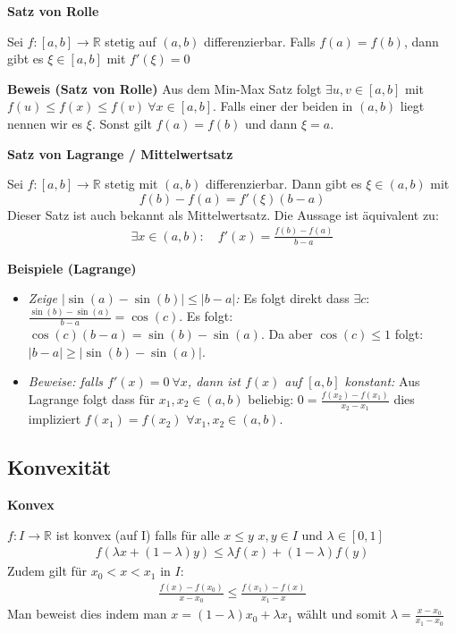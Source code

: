 \documentclass[25pt]{sciposter}
\newcommand{\R}{\mathbb{R}}
\newenvironment{method}[1]{\begin{mdframed}[backgroundcolor=blue!10,innertopmargin=15pt, innerbottommargin=15pt,nobreak=true]
		\textbf{#1 }
	}
	{ 
	\end{mdframed}
}
\begin{document}
\begin{multicols}{3}
\begin{method}{Satz von Rolle}
	Sei $f: [a,b] \to \R$ stetig auf $(a,b)$ differenzierbar. Falls $f(a) = f(b)$, dann gibt es $\xi \in [a,b]$ mit $f'(\xi) = 0$
\end{method}
\textbf{Beweis (Satz von Rolle)} Aus dem Min-Max Satz folgt $\exists u,v \in [a,b]$ mit $f(u) \leq f(x) \leq f(v) \ \forall x \in [a,b]$. Falls einer der beiden in $(a,b)$ liegt nennen wir es $\xi$. Sonst gilt $f(a) = f(b)$ und dann $\xi = a$.


\begin{method}{Satz von Lagrange / Mittelwertsatz}
	Sei $f:[a,b] \to \R$ stetig mit $(a,b)$ differenzierbar. Dann gibt es $\xi \in (a,b)$ mit $$f(b) - f(a) = f'(\xi) (b-a)$$
	Dieser Satz ist auch bekannt als Mittelwertsatz. Die Aussage ist äquivalent zu: 
	\begin{align*}
		\exists x \in (a,b) : \quad f'(x) = \frac{f(b) -f(a) }{b-a}
	\end{align*}
\end{method}
\textbf{Beispiele (Lagrange)}
\begin{itemize}
	\item \textit{Zeige $|\sin(a) - \sin(b)| \leq |b-a|$:} Es folgt direkt dass $\exists c$: $\frac{\sin(b)- \sin(a)}{b-a} = \cos(c)$. Es folgt: $\cos(c) (b-a) = \sin(b) - \sin(a)$. Da aber $\cos(c) \leq 1$ folgt:
	$|b-a| \geq |\sin(b) - \sin(a)|$.
	\item \textit{Beweise: falls $f'(x) = 0 \ \forall x$, dann ist $f(x)$ auf $[a,b]$ konstant:} Aus Lagrange folgt dass für $x_1,x_2\in (a,b)$ beliebig: $0 = \frac{f(x_2)-f(x_1)}{x_2-x_1}$ dies impliziert $f(x_1) = f(x_2)$ $\forall x_1,x_2 \in (a,b)$.
\end{itemize}

\subsection*{Konvexität}

\begin{method}{Konvex}
	$f : I \to \R$ ist konvex (auf I) falls für alle $x \leq y$ $x,y \in I$ und $\lambda \in [0,1]$
	\begin{align*}
	f(\lambda x + (1-\lambda)y) \leq \lambda f(x) + (1-\lambda)f(y)
	\end{align*}
	Zudem gilt für $x_0 < x< x_1$ in $I$:
	\begin{align*}
	 \frac{f(x) - f(x_0)}{x-x_0} \leq \frac{f(x_1) - f(x)}{x_1 - x}
	\end{align*}
	Man beweist dies indem man $x = (1-\lambda) x_0 + \lambda x_1$ wählt und somit $\lambda = \frac{x-x_0}{x_1 - x_0}$
\end{method}





\end{multicols}
\end{document}
